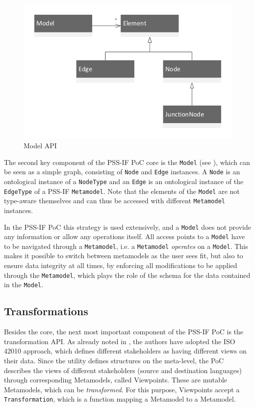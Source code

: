 \begin{figure}
\centering
\includegraphics[scale=0.75]{figures/model.pdf}
\caption{Model API}
\label{fig:model}
\end{figure}

The second key component of the PSS-IF PoC core is the \texttt{Model} (see ), which can be seen as a simple graph, consisting of \texttt{Node} and \texttt{Edge} instances. A \texttt{Node} is an ontological instance of a \texttt{NodeType} and an \texttt{Edge} is an ontological instance of the \texttt{EdgeType} of a PSS-IF \texttt{Metamodel}. Note that the elements of the \texttt{Model} are not type-aware themselves and can thus be accessed with different \texttt{Metamodel} instances.

In the PSS-IF PoC this strategy is used extensively, and a \texttt{Model} does not provide any information or allow any operations itself. All access points to a \texttt{Model} have to be navigated through a \texttt{Metamodel}, i.e. a \texttt{Metamodel} \textit{operates} on a \texttt{Model}. This makes it possible to switch between metamodels as the user sees fit, but also to ensure data integrity at all times, by enforcing all modifications to be applied through the \texttt{Metamodel}, which plays the role of the schema for the data contained in the \texttt{Model}.

\subsection{Transformations}

Besides the core, the next most important component of the PSS-IF PoC is the transformation API. As already noted in , the authors have adopted the ISO 42010 approach, which defines different stakeholders as having different views on their data. Since the utility defines structures on the meta-level, the PoC describes the views of different stakeholders (source and destination languages) through corresponding Metamodels, called Viewpoints. These are mutable Metamodels, which can be \textit{transformed}. For this purpose, Viewpoints accept a \texttt{Transformation}, which is a function mapping a Metamodel to a Metamodel.

